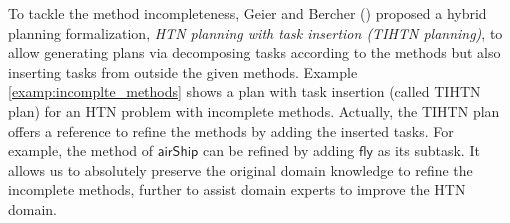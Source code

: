 \documentclass[letterpaper]{article} %
\begin{document}
%


To tackle the method incompleteness,
Geier and Bercher (\citeyear{geier2011decidability}) proposed a hybrid planning formalization, \emph{HTN planning with task insertion (TIHTN planning)}, to allow generating plans via decomposing tasks according to the methods but also inserting tasks from outside the given methods.
Example \ref{examp:incomplte_methods} shows a plan with task insertion (called TIHTN plan) for an HTN problem with incomplete methods.
Actually, the TIHTN plan offers a reference to refine the methods by adding the inserted tasks.
For example, the method of $\mathsf{airShip}$ can be refined by adding $\mathsf{fly}$ as its subtask.
It allows us to absolutely preserve the original domain knowledge to refine the incomplete methods, further to assist domain experts to improve the HTN domain.
\end{document}
